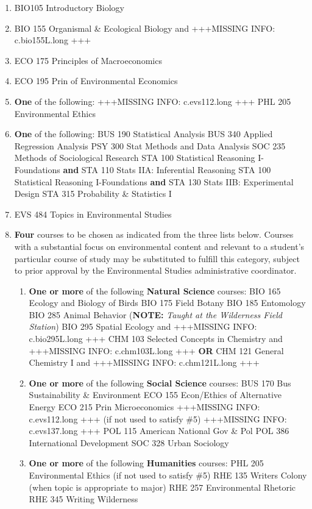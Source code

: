 \documentclass[
  letterpaper,
]{scrbook}
\providecommand{\tightlist}{%
  \setlength{\itemsep}{0pt}\setlength{\parskip}{0pt}}
\begin{document}
\begin{enumerate}
\def\labelenumi{\arabic{enumi}.}
\tightlist
\item
  BIO105 Introductory Biology
\item
  BIO 155 Organismal \& Ecological Biology and +++MISSING INFO:
  c.bio155L.long +++
\item
  ECO 175 Principles of Macroeconomics
\item
  ECO 195 Prin of Environmental Economics
\item
  \textbf{One} of the following: +++MISSING INFO: c.evs112.long +++ PHL
  205 Environmental Ethics
\item
  \textbf{One} of the following: BUS 190 Statistical Analysis BUS 340
  Applied Regression Analysis PSY 300 Stat Methods and Data Analysis SOC
  235 Methods of Sociological Research STA 100 Statistical Reasoning
  I-Foundations \textbf{and} STA 110 Stats IIA: Inferential Reasoning
  STA 100 Statistical Reasoning I-Foundations \textbf{and} STA 130 Stats
  IIB: Experimental Design STA 315 Probability \& Statistics I
\item
  EVS 484 Topics in Environmental Studies
\item
  \textbf{Four} courses to be chosen as indicated from the three lists
  below. Courses with a substantial focus on environmental content and
  relevant to a student's particular course of study may be substituted
  to fulfill this category, subject to prior approval by the
  Environmental Studies administrative coordinator.

  \begin{enumerate}
  \def\labelenumii{\alph{enumii}.}
  \tightlist
  \item
    \textbf{One or more} of the following \textbf{Natural Science}
    courses: BIO 165 Ecology and Biology of Birds BIO 175 Field Botany
    BIO 185 Entomology BIO 285 Animal Behavior (\textbf{NOTE:}
    \emph{Taught at the Wilderness Field Station}) BIO 295 Spatial
    Ecology and +++MISSING INFO: c.bio295L.long +++ CHM 103 Selected
    Concepts in Chemistry and +++MISSING INFO: c.chm103L.long +++
    \textbf{OR} CHM 121 General Chemistry I and +++MISSING INFO:
    c.chm121L.long +++
  \item
    \textbf{One or more} of the following \textbf{Social Science}
    courses: BUS 170 Bus Sustainability \& Environment ECO 155
    Econ/Ethics of Alternative Energy ECO 215 Prin Microeconomics
    +++MISSING INFO: c.evs112.long +++ (if not used to satisfy \#5)
    +++MISSING INFO: c.evs137.long +++ POL 115 American National Gov \&
    Pol POL 386 International Development SOC 328 Urban Sociology
  \item
    \textbf{One or more} of the following \textbf{Humanities} courses:
    PHL 205 Environmental Ethics (if not used to satisfy \#5) RHE 135
    Writers Colony (when topic is appropriate to major) RHE 257
    Environmental Rhetoric RHE 345 Writing Wilderness
  \end{enumerate}
\end{enumerate}
\end{document}
